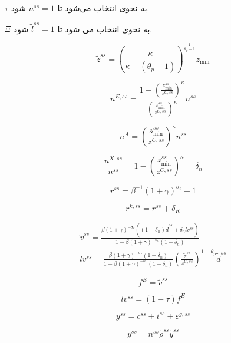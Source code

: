 \documentclass[11pt]{article}
\begin{document}
$\tau $ به نحوی انتخاب می‌شود تا ${n^{ss}} = 1$ شود.

$\Xi $ به نحوی انتخاب می شود تا ${\tilde l^{ss}} = 1$ شود.


\[
{\tilde z^{ss}} = {\left( {\frac{\kappa }{{\kappa  - ({\theta _p} - 1)}}}
\right)^{\frac{1}{{{\theta _p} - 1}}}}{z_{\min }}
\]



\[
{n^{E,ss}} = \frac{{1 - {{\left( {\frac{{z_{\min }^{ss}}}{{{z^{C,ss}}}}}
\right)}^\kappa }}}{{{{\left( {\frac{{z_{\min }^{ss}}}{{{z^{C,ss}}}}}
\right)}^\kappa }}}{n^{ss}}
\]



\[
{n^A} = {\left( {\frac{{z_{\min }^{ss}}}{{{z^{C,ss}}}}} \right)^\kappa }{n^{ss}}
\]



\[
\frac{{{n^{X,ss}}}}{{{n^{ss}}}} = 1 - {\left( {\frac{{z_{\min
}^{ss}}}{{{z^{C,ss}}}}} \right)^\kappa } = {\delta _n}
\]



\[
{r^{ss}} = {\beta ^{ - 1}}{\left( {1 + \gamma } \right)^{{\sigma _c}}} - 1
\]



\[
{r^{k,ss}} = {r^{ss}} + {\delta _K}
\]



\[
\begin{array}{l}
{{\tilde v}^{ss}} = \frac{{\beta {{\left( {1 + \gamma } \right)}^{ - {\sigma
_c}}}\left( {(1 - {\delta _n}){{\tilde d}^{ss}} + {\delta _n}l{v^{ss}}}
\right)}}{{1 - \beta {{\left( {1 + \gamma } \right)}^{ - {\sigma _c}}}\left( {1 -
{\delta _n}} \right)}}\\
l{v^{ss}} = \frac{{\beta {{\left( {1 + \gamma } \right)}^{ - {\sigma _c}}}\left(
{1 - {\delta _n}} \right)}}{{1 - \beta {{\left( {1 + \gamma } \right)}^{ -
{\sigma _c}}}\left( {1 - {\delta _n}} \right)}}{\left( {\frac{{{{\tilde
z}^{ss}}}}{{{z^{C,ss}}}}} \right)^{1 - {\theta _p}}}{{\tilde d}^{ss}}
\end{array}
\]



\[
{f^E} = {\tilde v^{ss}}
\]



\[
l{v^{ss}} = (1 - \tau ){f^E}
\]



\[
{y^{ss}} = {c^{ss}} + {i^{ss}} + {\varepsilon ^{g,ss}}
\]



\[
{y^{ss}} = {n^{ss}}{\tilde \rho ^{ss}}{\tilde y^{ss}}
\]
\end{document}
